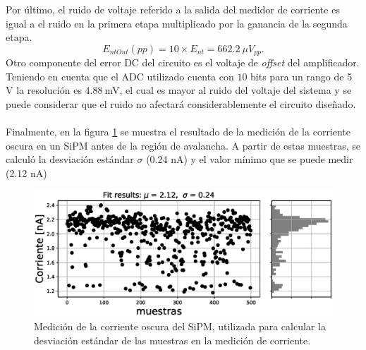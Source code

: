 Por último, el ruido de voltaje referido a la salida del medidor de corriente es igual a el ruido en la primera etapa multiplicado por la ganancia de la segunda etapa.
\begin{equation}
     E_{ntOut}(pp)= 10\times E_{nt}=662.2~\mu V_{pp}.
\end{equation}
Otro componente del error DC del circuito es el voltaje de \textit{offset} del amplificador. Teniendo en cuenta que el ADC utilizado cuenta con $10$ bits para un rango de 5 V la resolución es $4.88~$mV, el cual es mayor al ruido del voltaje del sistema y se puede considerar que el ruido no afectará considerablemente el circuito diseñado.\\ \\
Finalmente, en la figura \ref{fig:Inoise} se muestra el resultado de la medición de la corriente oscura en un SiPM antes de la región de avalancha. A partir de estas muestras, se calculó la desviación estándar $\sigma$ (0.24 nA) y el valor mínimo que se puede medir (2.12 nA)
\begin{figure}[h!]
\begin{centering}
  \includegraphics[width=\textwidth]{Images/Inoise.eps}
    \caption{Medición de la corriente oscura del SiPM, utilizada para calcular la desviación estándar de las muestras en la medición de corriente.}
    \label{fig:Inoise}
  \par\end{centering}
\end{figure}
